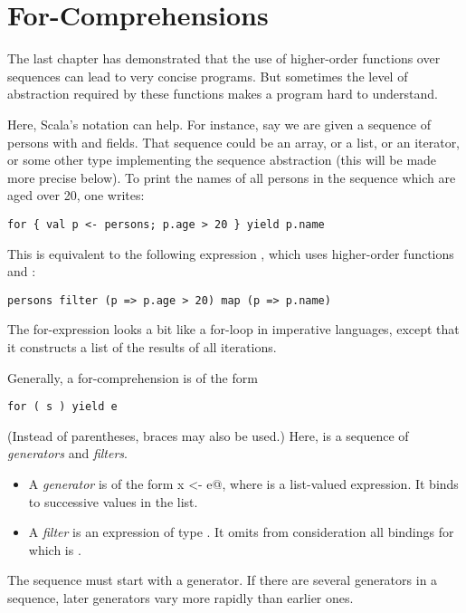 \documentclass[11pt]{report}
\begin{document}

\chapter{\label{sec:for-notation}For-Comprehensions}

The last chapter has demonstrated that the use of higher-order
functions over sequences can lead to very concise programs. But
sometimes the level of abstraction required by these functions makes a
program hard to understand.

Here, Scala's \verb@for@ notation can help. For instance, say we are
given a sequence \verb@persons@ of persons with \verb@name@ and
\verb@age@ fields.  That sequence could be an array, or a list, or an
iterator, or some other type implementing the sequence abstraction
(this will be made more precise below). To print the names of all
persons in the sequence which are aged over 20, one writes:
\begin{verbatim}
for { val p <- persons; p.age > 20 } yield p.name
\end{verbatim}
This is equivalent to the following expression , which uses
higher-order functions \verb@filter@ and \verb@map@:
\begin{verbatim}
persons filter (p => p.age > 20) map (p => p.name)
\end{verbatim}
The for-expression looks a bit like a for-loop in imperative languages,
except that it constructs a list of the results of all iterations.

Generally, a for-comprehension is of the form
\begin{verbatim}
for ( s ) yield e
\end{verbatim}
(Instead of parentheses, braces may also be used.)
Here, \verb@s@ is a sequence of {\em generators} and {\em filters}.
\begin{itemize}
\item A {\em generator} is of the form \verb@val x <- e@,
where \verb@e@ is a list-valued expression. It binds \verb@x@ to
successive values in the list.
\item A {\em filter} is an expression \verb@f@ of type \verb@Boolean@.
It omits from consideration all bindings for which \verb@f@ is \verb@False@.
\end{itemize}
The sequence must start with a generator.
If there are several generators in a sequence, later generators vary
more rapidly than earlier ones.
\end{document}
